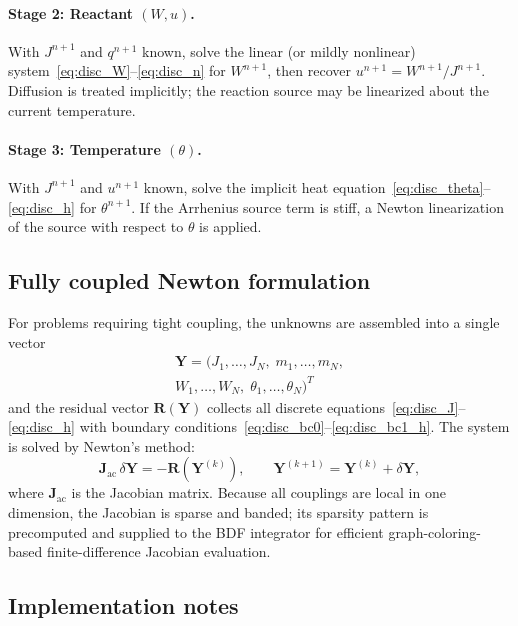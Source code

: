 \paragraph{Stage 2: Reactant $(W,u)$.}
With $J^{n+1}$ and $q^{n+1}$ known, solve the linear (or mildly nonlinear) system~\eqref{eq:disc_W}--\eqref{eq:disc_n} for $W^{n+1}$, then recover $u^{n+1} = W^{n+1}/J^{n+1}$. Diffusion is treated implicitly; the reaction source may be linearized about the current temperature.

\paragraph{Stage 3: Temperature $(\theta)$.}
With $J^{n+1}$ and $u^{n+1}$ known, solve the implicit heat equation~\eqref{eq:disc_theta}--\eqref{eq:disc_h} for $\theta^{n+1}$. If the Arrhenius source term is stiff, a Newton linearization of the source with respect to $\theta$ is applied.

\subsection{Fully coupled Newton formulation}

For problems requiring tight coupling, the unknowns are assembled
into a single vector
\begin{multline}
  \bm{Y} = (J_1,\dots,J_N,\;m_1,\dots,m_N,\\
  W_1,\dots,W_N,\;\theta_1,\dots,\theta_N)^T
\end{multline}
and the residual vector $\bm{R}(\bm{Y})$ collects all discrete equations~\eqref{eq:disc_J}--\eqref{eq:disc_h} with boundary conditions~\eqref{eq:disc_bc0}--\eqref{eq:disc_bc1_h}. The system is solved by Newton's method:
\begin{equation}
  \bm{J}_\mathrm{ac}\,\delta\bm{Y} = -\bm{R}(\bm{Y}^{(k)}),
  \qquad
  \bm{Y}^{(k+1)} = \bm{Y}^{(k)} + \delta\bm{Y},
\end{equation}
where $\bm{J}_\mathrm{ac}$ is the Jacobian matrix. Because all couplings are local in one dimension, the Jacobian is sparse and banded; its sparsity pattern is precomputed and supplied to the BDF integrator for efficient graph-coloring-based finite-difference Jacobian evaluation.

\subsection{Implementation notes}

